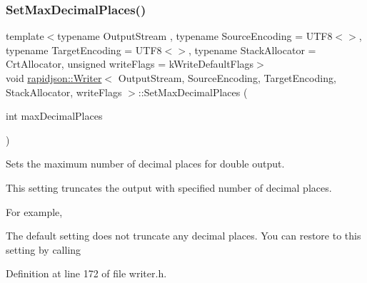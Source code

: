 \subsubsection{\texorpdfstring{SetMaxDecimalPlaces()}{SetMaxDecimalPlaces()}}
{\footnotesize\ttfamily template$<$typename Output\+Stream , typename Source\+Encoding  = U\+T\+F8$<$$>$, typename Target\+Encoding  = U\+T\+F8$<$$>$, typename Stack\+Allocator  = Crt\+Allocator, unsigned write\+Flags = k\+Write\+Default\+Flags$>$ \\
void \mbox{\hyperlink{classrapidjson_1_1_writer}{rapidjson\+::\+Writer}}$<$ Output\+Stream, Source\+Encoding, Target\+Encoding, Stack\+Allocator, write\+Flags $>$\+::Set\+Max\+Decimal\+Places (\begin{DoxyParamCaption}\item[{int}]{max\+Decimal\+Places }\end{DoxyParamCaption})}



Sets the maximum number of decimal places for double output. 

This setting truncates the output with specified number of decimal places.

For example,


\begin{DoxyCode}{0}
\end{DoxyCode}


The default setting does not truncate any decimal places. You can restore to this setting by calling 
\begin{DoxyCode}{0}
\end{DoxyCode}
 

Definition at line 172 of file writer.\+h.


